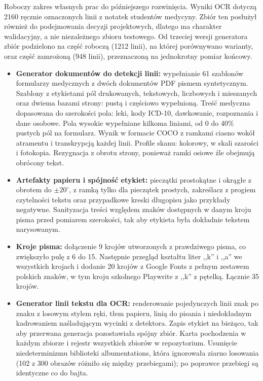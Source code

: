 Roboczy zakres własnych prac do późniejszego rozwinięcia. Wyniki OCR dotyczą
2160 ręcznie oznaczonych linii z notatek studentów medycyny. Zbiór ten
posłużył również do podejmowania decyzji projektowych, dlatego ma charakter
walidacyjny, a nie niezależnego zbioru testowego. Od trzeciej
wersji generatora zbiór podzielono na część roboczą (1212 linii), na której
porównywano warianty, oraz część zamrożoną (948 linii), przeznaczoną
na jednokrotny pomiar końcowy.

\begin{itemize}
	\item \textbf{Generator dokumentów do detekcji linii:} wypełnianie
	61 szablonów formularzy medycznych z dwóch dokumentów PDF pismem
	syntetycznym. Szablony z etykietami pól drukowanych, tekstowych,
	liczbowych i mieszanych oraz dwiema bazami strony: pustą i częściowo
	wypełnioną. Treść medyczna dopasowana do szerokości pola: leki, kody
	ICD-10, dawkowanie, rozpoznania i dane osobowe. Pola wysokie wypełniane
	kilkoma liniami, od 0 do 40\% pustych pól na formularz. Wynik w formacie
	COCO z ramkami ciasno wokół atramentu i transkrypcją każdej linii.
	Profile skanu: kolorowy, w skali szarości i fotokopia. Rezygnacja
	z obrotu strony, ponieważ ramki osiowe źle obejmują obrócony tekst.

	\item \textbf{Artefakty papieru i spójność etykiet:} pieczątki
	prostokątne i okrągłe z obrotem do $\pm 20^\circ$, z ramką tylko dla
	pieczątek prostych, zakreślacz z progiem czytelności tekstu oraz
	przypadkowe kreski długopisu jako przykłady negatywne. Sanityzacja
	treści względem znaków dostępnych w danym kroju pisma przed pomiarem
	szerokości, tak aby etykieta była dokładnie tekstem narysowanym.

	\item \textbf{Kroje pisma:} dołączenie 9 krojów utworzonych
	z prawdziwego pisma, co zwiększyło pulę z 6 do 15. Następnie przegląd
	kształtu liter ,,k'' i ,,a'' we wszystkich krojach i dodanie 20 krojów
	z Google Fonts z pełnym zestawem polskich znaków, w tym kroju szkolnego
	Playwrite z ,,k'' z pętelką. Łącznie 35 krojów.

	\item \textbf{Generator linii tekstu dla OCR:} renderowanie pojedynczych
	linii znak po znaku z losowym stylem ręki, tłem papieru, linią do pisania
	i niedokładnym kadrowaniem naśladującym wycinki z detektora. Zapis
	etykiet na bieżąco, tak aby przerwana generacja pozostawiała spójny
	zbiór. Karta pochodzenia w każdym zbiorze i rejestr wszystkich zbiorów
	w repozytorium. Usunięcie niedeterminizmu biblioteki albumentations,
	która ignorowała ziarno losowania (102 z 300 obrazów różniło się między
	przebiegami); po poprawce przebiegi są identyczne co do bajta.


\end{itemize}
